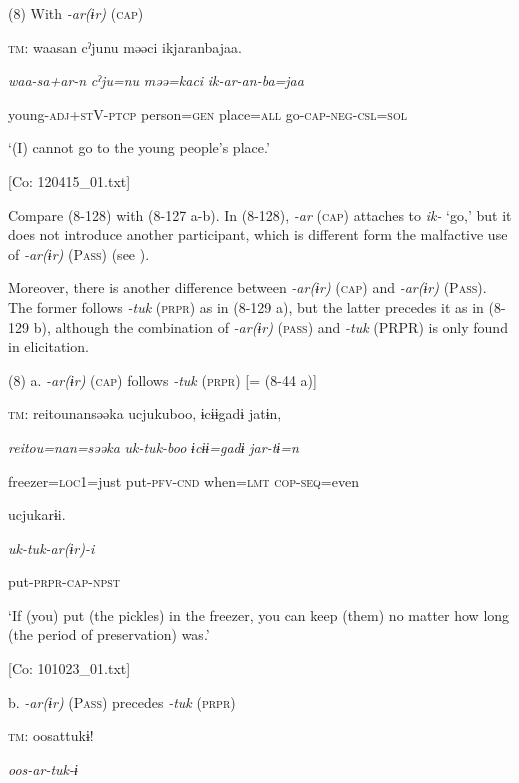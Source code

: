 (8)  With \textit{{}-ar(ɨr)} (\textsc{cap})

  \textsc{tm}:  waasan  cˀjunu  məəci  ikjaranbajaa.

    \textit{waa-sa+ar-n}  \textit{cˀju=nu}  \textit{məə=kaci}  \textit{ik-ar{}-an-ba=jaa}

    young-\textsc{adj}+\textsc{st}V-\textsc{ptcp}  person=\textsc{gen}  place=\textsc{all}  go-\textsc{cap}-\textsc{neg}-\textsc{csl}=\textsc{sol}

    ‘(I) cannot go to the young people’s place.’

    [Co: 120415\_01.txt]

Compare (8-128) with (8-127 a-b). In (8-128), \textit{{}-ar} (\textsc{cap}) attaches to \textit{ik-} ‘go,’ but it does not introduce another participant, which is different form the malfactive use of \textit{{}-ar(ɨr)} (P\textsc{ass}) (see ).

  Moreover, there is another difference between \textit{{}-ar(ɨr)} (\textsc{cap}) and \textit{{}-ar(ɨr)} (P\textsc{ass}). The former follows \textit{{}-tuk} (\textsc{prpr}) as in (8-129 a), but the latter precedes it as in (8-129 b), although the combination of \textit{{}-ar(ɨr)} (\textsc{pass}) and \textit{{}-tuk} (PRPR) is only found in elicitation.

(8)  a. \textit{{}-ar(ɨr)} (\textsc{cap}) follows \textit{{}-tuk} (\textsc{prpr}) [= (8-44 a)]

  \textsc{tm}:  {\textbar}reitou{\textbar}nansəəka  ucjukuboo,  ɨcɨɨgadɨ  jatɨn,

    \textit{reitou=nan=səəka}  \textit{uk-tuk-boo}  \textit{ɨcɨɨ=gadɨ}  \textit{jar-tɨ=n}

    freezer=\textsc{loc}1=just  put-\textsc{pfv}-\textsc{cnd}  when=\textsc{lmt}  \textsc{cop}-\textsc{seq}=even

    ucjukarɨi.

    \textit{uk-tuk-ar(ɨr){}-i}

    put-\textsc{prpr}-\textsc{cap}-\textsc{npst}

    ‘If (you) put (the pickles) in the freezer, you can keep (them) no matter how long (the period of preservation) was.’

    [Co: 101023\_01.txt]

  b. \textit{{}-ar(ɨr)} (P\textsc{ass}) precedes \textit{{}-tuk} (\textsc{prpr})

  \textsc{tm}:  oosattukɨ!

    \textit{oos-ar-tuk{}-ɨ}

